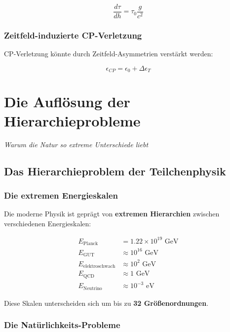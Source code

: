 \documentclass[12pt,a4paper]{report}
\begin{document}
	\begin{equation}
		\frac{d\tau}{dh} = \tau_0\frac{g}{c^2}
	\end{equation}
	
	\subsection{Zeitfeld-induzierte CP-Verletzung}
	
	CP-Verletzung könnte durch Zeitfeld-Asymmetrien verstärkt werden:
	
	\begin{equation}
		\epsilon_{CP} = \epsilon_0 + \Delta\epsilon_T
	\end{equation}
	
	\chapter{Die Auflösung der Hierarchieprobleme}
	\textit{Warum die Natur so extreme Unterschiede liebt}
	
	\section{Das Hierarchieproblem der Teilchenphysik}
	
	\subsection{Die extremen Energieskalen}
	
	Die moderne Physik ist geprägt von \textbf{extremen Hierarchien} zwischen verschiedenen Energieskalen:
	
	\begin{align}
		E_{\text{Planck}} &= 1.22 \times 10^{19} \text{ GeV} \\
		E_{\text{GUT}} &\approx 10^{16} \text{ GeV} \\
		E_{\text{elektroschwach}} &\approx 10^2 \text{ GeV} \\
		E_{\text{QCD}} &\approx 1 \text{ GeV} \\
		E_{\text{Neutrino}} &\approx 10^{-3} \text{ eV}
	\end{align}
	
	Diese Skalen unterscheiden sich um bis zu \textbf{32 Größenordnungen}.
	
	\subsection{Die Natürlichkeits-Probleme}
	
\end{document}

